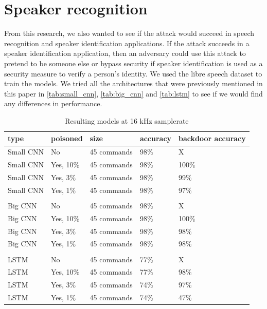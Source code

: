 \documentclass{report}
\theoremstyle{definition}
\theoremstyle{remark}
\begin{document}
\section{Speaker recognition }
From this research, we also wanted to see if the attack would succeed in speech recognition and speaker identification applications. If the attack succeeds in a speaker identification application, then an adversary could use this attack to pretend to be someone else or bypass security if speaker identification is used as a security measure to verify a person's identity. We  used the libre speech dataset \cite{7178964} to train the models. We tried all the architectures that were previously mentioned in this paper in \autoref{tab:small_cnn}, \autoref{tab:big_cnn} and \autoref{tab:lstm} to see if we would find any differences in performance.  

\begin{table}[!hbt]
\centering
\begin{tabular}{|l|l|l|l|l|}
\hline
type & poisoned & size & accuracy &   backdoor accuracy \\ \hline
Small CNN & No  &  45 commands  &   98\%  & X     \\ \hline
Small CNN & Yes, 10\%  &  45 commands  &  98\% & 100\%        \\ \hline
Small CNN & Yes, 3\%  &  45 commands  &  98\%  & 99\%     \\ \hline
Small CNN & Yes, 1\%  &  45 commands  &  98\%  & 97\%     \\ \hline
 &  &  &  &  \\ \hline
Big CNN & No  &  45 commands  &   98\%  & X     \\ \hline
Big CNN & Yes, 10\%  &  45 commands  &  98\% & 100\%        \\ \hline
Big CNN & Yes, 3\%  &  45 commands  &  98\%  & 98\%     \\ \hline
Big CNN & Yes, 1\%  &  45 commands  &  98\%  & 98\%     \\ \hline
 &  &  &  &  \\ \hline
LSTM & No  &  45 commands  &   77\%  & X     \\ \hline
LSTM & Yes, 10\%  &  45 commands  &  77\% & 98\%        \\ \hline
LSTM & Yes, 3\%  &  45 commands  &  74\%  & 97\%     \\ \hline
LSTM & Yes, 1\%  &  45 commands  &  74\%  & 47\%     \\ \hline
\end{tabular}
\caption{Resulting models at 16 kHz samplerate}
\label{tab:speaker_reg}
\end{table}
\end{document}
